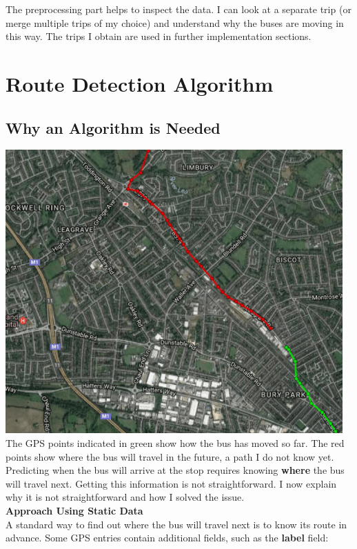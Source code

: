 \documentclass[12pt,a4paper,oneside,openright]{report}
\begin{document}
The preprocessing part helps to inspect the data. I can look at a separate trip (or merge 
multiple trips of my choice) and understand why the buses are moving in this way.
The trips I obtain are used in further implementation sections.

\section{Route Detection Algorithm}

\subsection{Why an Algorithm is Needed}

\includegraphics[scale=0.8]{figs/route_detector.png} \\

The GPS points indicated in green show how the bus has moved so far.
The red points show where the bus will travel in the future,
a path I do not know yet. Predicting when the bus will arrive at the stop
requires knowing \textbf{where} the bus will travel next. Getting this information is not straightforward.
I now explain why it is not straightforward and how I solved the issue. \\

\textbf{Approach Using Static Data} \\

A standard way to find out where the bus will travel next is to know its 
route in advance. Some GPS entries contain additional fields,
such as the \textbf{label} field:
\end{document}
